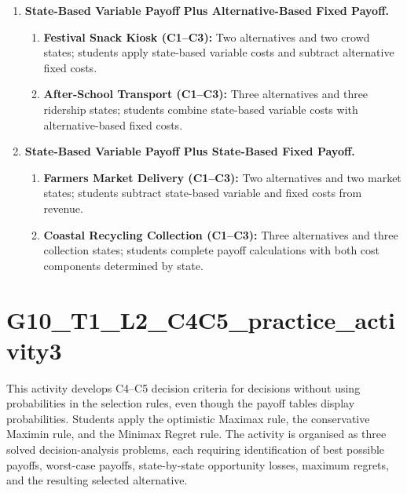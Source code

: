 \begin{enumerate}
		\item \textbf{State-Based Variable Payoff Plus Alternative-Based Fixed Payoff.}
		\begin{enumerate}
			\item \textbf{Festival Snack Kiosk (C1--C3):} Two alternatives and two crowd states; students apply state-based variable costs and subtract alternative fixed costs.
			\item \textbf{After-School Transport (C1--C3):} Three alternatives and three ridership states; students combine state-based variable costs with alternative-based fixed costs.
		\end{enumerate}
		\item \textbf{State-Based Variable Payoff Plus State-Based Fixed Payoff.}
		\begin{enumerate}
			\item \textbf{Farmers Market Delivery (C1--C3):} Two alternatives and two market states; students subtract state-based variable and fixed costs from revenue.
			\item \textbf{Coastal Recycling Collection (C1--C3):} Three alternatives and three collection states; students complete payoff calculations with both cost components determined by state.
		\end{enumerate}
	\end{enumerate}

	\section{G10\_T1\_L2\_C4C5\_practice\_activity3}
	This activity develops C4--C5 decision criteria for decisions without using probabilities in the selection rules, even though the payoff tables display probabilities. Students apply the optimistic Maximax rule, the conservative Maximin rule, and the Minimax Regret rule. The activity is organised as three solved decision-analysis problems, each requiring identification of best possible payoffs, worst-case payoffs, state-by-state opportunity losses, maximum regrets, and the resulting selected alternative.

